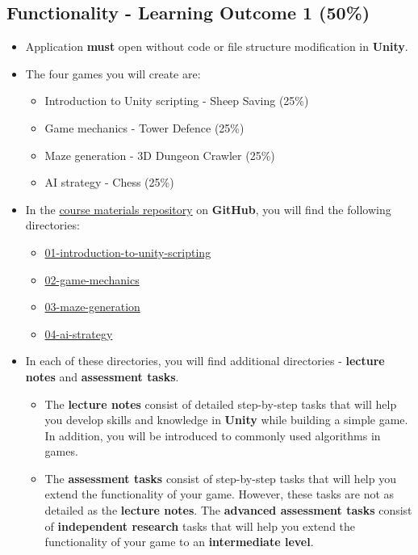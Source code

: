 \documentclass{article}
\begin{document}
\subsection*{Functionality - Learning Outcome 1 (50\%)}
\begin{itemize}
	\item Application \textbf{must} open without code or file structure modification in \textbf{Unity}.
	\item The four games you will create are:
	\begin{itemize}
		\item Introduction to Unity scripting - Sheep Saving (25\%)
		\item Game mechanics - Tower Defence (25\%)
		\item Maze generation - 3D Dungeon Crawler (25\%)
		\item AI strategy - Chess (25\%)
	\end{itemize}
	\item In the \href{https://github.com/otago-polytechnic-bit-courses/ID623001-introduction-to-algorithmic-problem-solving}{course materials repository} on \textbf{GitHub}, you will find the following directories:
	\begin{itemize}
		\item \href{https://github.com/otago-polytechnic-bit-courses/ID623001-introduction-to-algorithmic-problem-solving/tree/main/01-introduction-to-unity-scripting}{01-introduction-to-unity-scripting}
		\item \href{https://github.com/otago-polytechnic-bit-courses/ID623001-introduction-to-algorithmic-problem-solving/tree/main/02-game-mechanics}{02-game-mechanics}
		\item \href{https://github.com/otago-polytechnic-bit-courses/ID623001-introduction-to-algorithmic-problem-solving/tree/main/03-maze-generation}{03-maze-generation}
		\item \href{https://github.com/otago-polytechnic-bit-courses/ID623001-introduction-to-algorithmic-problem-solving/tree/main/04-ai-strategy}{04-ai-strategy}
	\end{itemize}
	\item In each of these directories, you will find additional directories - \textbf{lecture notes} and \textbf{assessment tasks}. 
	\begin{itemize}
		\item The \textbf{lecture notes} consist of detailed step-by-step tasks that will help you develop skills and knowledge in \textbf{Unity} while building a simple game. In addition, you will be introduced to commonly used algorithms in games.
		\item The \textbf{assessment tasks} consist of step-by-step tasks that will help you extend the functionality of your game. However, these tasks are not as detailed as the \textbf{lecture notes}. The \textbf{advanced assessment tasks} consist of \textbf{independent research} tasks that will help you extend the functionality of your game to an \textbf{intermediate level}.
	\end{itemize} 
\end{itemize}
\end{document}
